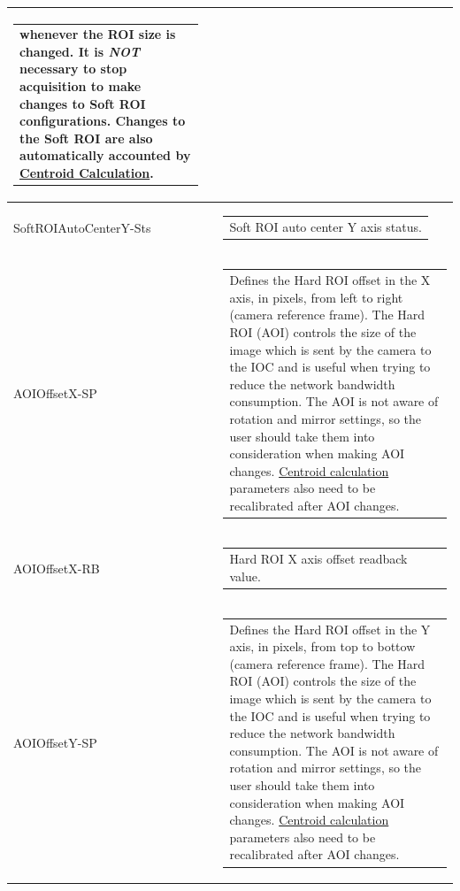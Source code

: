 \documentclass[openany]{article}
\begin{document}
\begin{longtable}{| m{3.0cm} m{4.5cm} m{7.0cm} |}
\begin{tabular}{@{}m{6cm}@{}}
                whenever the ROI size is changed. It is \emph{NOT} necessary to stop
                acquisition to make changes to Soft ROI configurations. Changes to the
                Soft ROI are also automatically accounted by 
                \hyperref[sec:centroid-calc]{Centroid Calculation}.
            \end{tabular} \\ \hline
        SoftROIAutoCenterY-Sts &  & \begin{tabular}{@{}m{6cm}@{}}
                Soft ROI auto center Y axis status.
            \end{tabular} \hypertarget{pv:hard-roi-off-x}{}\\ \hline
        AOIOffsetX-SP &  & \begin{tabular}{@{}m{6cm}@{}}
                Defines the Hard ROI offset in the X axis, in pixels, from left to right
                (camera reference frame). The Hard ROI (AOI) controls the size of the image
                which is sent by the camera to the IOC and is useful when trying to reduce
                the network bandwidth consumption. The AOI is not aware of rotation and
                mirror settings, so the user should take them into consideration when making
                AOI changes. \hyperref[sec:centroid-calc]{Centroid calculation} parameters
                also need to be recalibrated after AOI changes.
            \end{tabular} \\ \hline
        AOIOffsetX-RB &  & \begin{tabular}{@{}m{6cm}@{}}
                Hard ROI X axis offset readback value.
            \end{tabular} \hypertarget{pv:hard-roi-off-y}{}\\ \hline
        AOIOffsetY-SP &  & \begin{tabular}{@{}m{6cm}@{}}
                Defines the Hard ROI offset in the Y axis, in pixels, from top to bottow
                (camera reference frame). The Hard ROI (AOI) controls the size of the image
                which is sent by the camera to the IOC and is useful when trying to reduce
                the network bandwidth consumption. The AOI is not aware of rotation and
                mirror settings, so the user should take them into consideration when making
                AOI changes. \hyperref[sec:centroid-calc]{Centroid calculation} parameters
                also need to be recalibrated after AOI changes.

\end{tabular}
\end{longtable}
\end{document}
